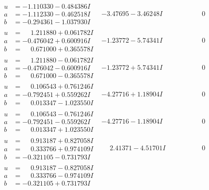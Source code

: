 \documentclass[1p]{elsarticle_modified}
\theoremstyle{definition}
\begin{document}
$$\begin{array}{c|c|c}
 \hline 
\begin{aligned}
u &= -1.110330 - 0.484386 I \\
a &= -1.112330 - 0.462518 I \\
b &= -0.294361 - 1.037930 I\end{aligned}
 & -3.47695 - 3.46248 I & \phantom{-0.000000 } 0 \\ \hline\begin{aligned}
u &= \phantom{-}1.211880 + 0.061782 I \\
a &= -0.476042 + 0.600916 I \\
b &= \phantom{-}0.671000 + 0.365578 I\end{aligned}
 & -1.23772 - 5.74341 I & \phantom{-0.000000 } 0 \\ \hline\begin{aligned}
u &= \phantom{-}1.211880 - 0.061782 I \\
a &= -0.476042 - 0.600916 I \\
b &= \phantom{-}0.671000 - 0.365578 I\end{aligned}
 & -1.23772 + 5.74341 I & \phantom{-0.000000 } 0 \\ \hline\begin{aligned}
u &= \phantom{-}0.106543 + 0.761246 I \\
a &= -0.792451 + 0.559262 I \\
b &= \phantom{-}0.013347 - 1.023550 I\end{aligned}
 & -4.27716 + 1.18904 I & \phantom{-0.000000 } 0 \\ \hline\begin{aligned}
u &= \phantom{-}0.106543 - 0.761246 I \\
a &= -0.792451 - 0.559262 I \\
b &= \phantom{-}0.013347 + 1.023550 I\end{aligned}
 & -4.27716 - 1.18904 I & \phantom{-0.000000 } 0 \\ \hline\begin{aligned}
u &= \phantom{-}0.913187 + 0.827058 I \\
a &= \phantom{-}0.333766 + 0.974109 I \\
b &= -0.321105 - 0.731793 I\end{aligned}
 & \phantom{-}2.41371 - 4.51701 I & \phantom{-0.000000 } 0 \\ \hline\begin{aligned}
u &= \phantom{-}0.913187 - 0.827058 I \\
a &= \phantom{-}0.333766 - 0.974109 I \\
b &= -0.321105 + 0.731793 I\end{aligned}

\end{array}$$
\end{document}
